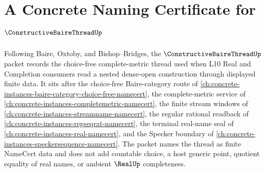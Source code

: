 \chapter{A Concrete Naming Certificate for $\ConstructiveBaireThreadUp$}
\label{ch:concrete-instances-constructive-baire-thread-namecert}

Following Baire, Oxtoby, and Bishop--Bridges, the $\ConstructiveBaireThreadUp$ packet records the choice-free complete-metric thread used when L10 Real and Completion consumers read a nested dense-open construction through displayed finite data. It sits after the choice-free Baire-category route of \autoref{ch:concrete-instances-baire-category-choice-free-namecert}, the complete-metric service of \autoref{ch:concrete-instances-completemetric-namecert}, the finite stream windows of \autoref{ch:concrete-instances-streamname-namecert}, the regular rational readback of \autoref{ch:concrete-instances-regseqrat-namecert}, the terminal real-name seal of \autoref{ch:concrete-instances-real-namecert}, and the Specker boundary of \autoref{ch:concrete-instances-speckersequence-namecert}. The packet names the thread as finite NameCert data and does not add countable choice, a host generic point, quotient equality of real names, or ambient $\RealUp$ completeness.

